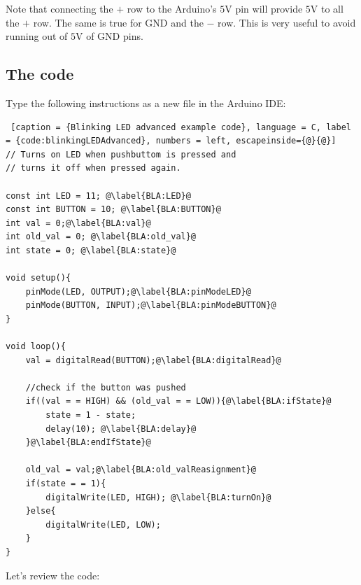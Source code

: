 Note that connecting the $+$ row to the Arduino's $5$V pin will provide $5$V to all the $+$ row. The same is true for GND and the $-$ row. This is very useful to avoid running out of $5$V of GND pins.


\subsection{The code}

Type the following instructions as a new file in the Arduino IDE:

\begin{lstlisting} [caption = {Blinking LED advanced example code}, language = C, label = {code:blinkingLEDAdvanced}, numbers = left, escapeinside={@}{@}]
// Turns on LED when pushbuttom is pressed and
// turns it off when pressed again.

const int LED = 11; @\label{BLA:LED}@
const int BUTTON = 10; @\label{BLA:BUTTON}@
int val = 0;@\label{BLA:val}@
int old_val = 0; @\label{BLA:old_val}@
int state = 0; @\label{BLA:state}@

void setup(){
	pinMode(LED, OUTPUT);@\label{BLA:pinModeLED}@
	pinMode(BUTTON, INPUT);@\label{BLA:pinModeBUTTON}@
}

void loop(){
	val = digitalRead(BUTTON);@\label{BLA:digitalRead}@
	
	//check if the button was pushed
	if((val = = HIGH) && (old_val = = LOW)){@\label{BLA:ifState}@
		state = 1 - state;
		delay(10); @\label{BLA:delay}@
	}@\label{BLA:endIfState}@
	
	old_val = val;@\label{BLA:old_valReasignment}@
	if(state = = 1){
		digitalWrite(LED, HIGH); @\label{BLA:turnOn}@
	}else{
		digitalWrite(LED, LOW);
	}
}
\end{lstlisting}

Let's review the code:


